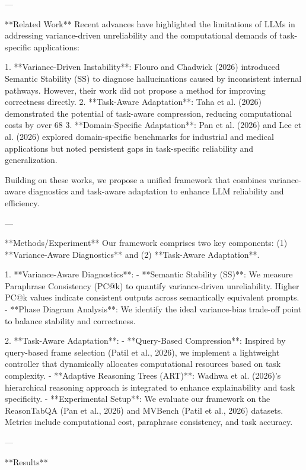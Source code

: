 ---

**Related Work**  
Recent advances have highlighted the limitations of LLMs in addressing variance-driven unreliability and the computational demands of task-specific applications:

1. **Variance-Driven Instability**: Flouro and Chadwick (2026) introduced Semantic Stability (SS) to diagnose hallucinations caused by inconsistent internal pathways. However, their work did not propose a method for improving correctness directly.
2. **Task-Aware Adaptation**: Taha et al. (2026) demonstrated the potential of task-aware compression, reducing computational costs by over 68%
3. **Domain-Specific Adaptation**: Pan et al. (2026) and Lee et al. (2026) explored domain-specific benchmarks for industrial and medical applications but noted persistent gaps in task-specific reliability and generalization.

Building on these works, we propose a unified framework that combines variance-aware diagnostics and task-aware adaptation to enhance LLM reliability and efficiency.

---

**Methods/Experiment**  
Our framework comprises two key components: (1) **Variance-Aware Diagnostics** and (2) **Task-Aware Adaptation**.

1. **Variance-Aware Diagnostics**:
   - **Semantic Stability (SS)**: We measure Paraphrase Consistency (PC@k) to quantify variance-driven unreliability. Higher PC@k values indicate consistent outputs across semantically equivalent prompts.
   - **Phase Diagram Analysis**: We identify the ideal variance-bias trade-off point to balance stability and correctness.

2. **Task-Aware Adaptation**:
   - **Query-Based Compression**: Inspired by query-based frame selection (Patil et al., 2026), we implement a lightweight controller that dynamically allocates computational resources based on task complexity.
   - **Adaptive Reasoning Trees (ART)**: Wadhwa et al. (2026)'s hierarchical reasoning approach is integrated to enhance explainability and task specificity.
   - **Experimental Setup**: We evaluate our framework on the ReasonTabQA (Pan et al., 2026) and MVBench (Patil et al., 2026) datasets. Metrics include computational cost, paraphrase consistency, and task accuracy.

---

**Results**  

